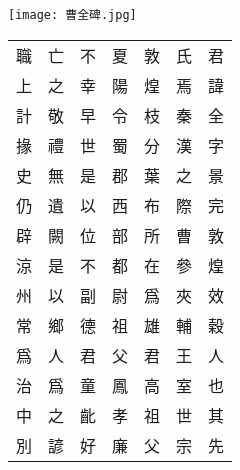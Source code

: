 \subsubsection*{}
\begin{wrapfigure}{O}{8.6cm}
	\centering
	\begin{boxhorizontalcompare}[width=8.6cm,lefthand width=4.2cm]
		\texttt{[image: 曹全碑.jpg]}
	\tcblower
		\color{white}\hspace{-6.45mm}\vspace{-1.2mm}
		\begin{NiceTabular}[cell-space-limits=4.1pt]{*{7}{W{c}{.1cm}}}
			職 & 亡 & 不 & 夏 & 敦 & 氏 & 君 \\
			上 & 之 & 幸 & 陽 & 煌 & 焉 & 諱 \\
			計 & 敬 & 早 & 令 & 枝 & 秦 & 全 \\
			掾 & 禮 & 世 & 蜀 & 分 & 漢 & 字 \\
			史 & 無 & 是 & 郡 & 葉 & 之 & 景 \\
			仍 & 遺 & 以 & 西 & 布 & 際 & 完 \\
			辟 & 闕 & 位 & 部 & 所 & 曹 & 敦 \\
			涼 & 是 & 不 & 都 & 在 & 參 & 煌 \\
			州 & 以 & 副 & 尉 & 爲 & 夾 & 效 \\
			常 & 鄉 & 德 & 祖 & 雄 & 輔 & 穀 \\
			爲 & 人 & 君 & 父 & 君 & 王 & 人 \\
			治 & 爲 & 童 & 鳳 & 高 & 室 & 也 \\
			中 & 之 & 齔 & 孝 & 祖 & 世 & 其 \\
			別 & 諺 & 好 & 廉 & 父 & 宗 & 先 \\
		\end{NiceTabular}
	\end{boxhorizontalcompare}
	\caption{}
	\footnotesize{\color{darkgray}}
	\label{figure:《曹全碑》片段}
\end{wrapfigure}
\par
